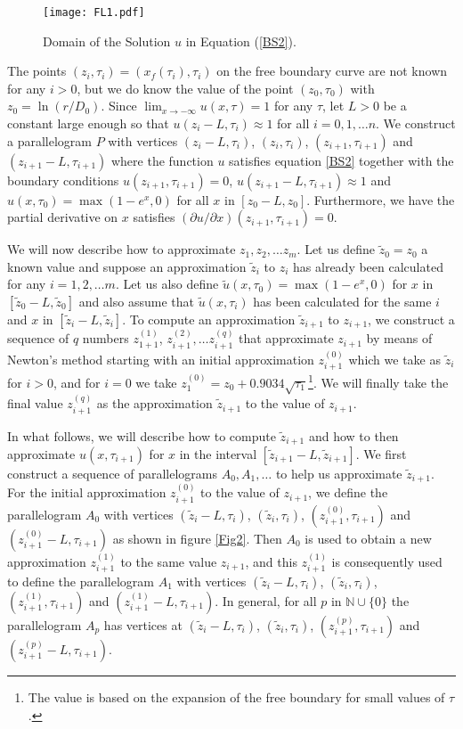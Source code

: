 \documentclass[00main.tex]{subfiles}
\begin{document}
\begin{figure}
\centering 
\texttt{[image: FL1.pdf]}
\caption{Domain of the Solution $u$ in Equation (\ref{BS2}).}
\label{Fig1}
\end{figure}  

The points $(z_i,\tau_i)=(x_f(\tau_i),\tau_i)$ on the free boundary curve are not known for any $i>0$, but we do know the value of the point $(z_0,\tau_0)$ with $z_0=\ln(r/D_0)$.  Since $\lim_{x\rightarrow -\infty} u(x,\tau)=1$ for any $\tau$, let $L>0$  be a constant large enough so that  $u(z_i-L,\tau_i)\approx 1$ for all $ i=0,1,\hdots n$.
We construct a parallelogram $P$ with vertices  $(z_i-L,\tau_i)$, $(z_i,\tau_i)$, $(z_{i+1},\tau_{i+1})$ and $(z_{i+1} - L,\tau_{i+1})$ where the function $u$ satisfies equation \eqref{BS2} together with the boundary conditions $u(z_{i+1},\tau_{i+1})=0$, $u(z_{i+1}-L,\tau_{i+1})\approx 1$ and $u(x,\tau_0)=\max(1-e^x,0)$ for all $x$ in $[z_0-L,z_0]$. Furthermore, we have the partial derivative on $x$ satisfies $ (\partial u / \partial x) (z_{i+1},\tau_{i+1})=0$.  

We will now describe how to approximate $z_1, z_2,\hdots z_m$.  Let us define $\tilde{z}_0=z_0$ a known value and suppose an approximation  $\tilde{z}_{i}$ to $z_{i}$ has already been calculated for any $i=1,2,\hdots m$. Let us also define $\tilde{u}(x,\tau_0)=\max(1-e^x,0)$ for $x$ in $[\tilde{z}_0-L,\tilde{z}_0]$ and also assume that $\tilde{u}(x,\tau_i)$ has been calculated for the same $i$ and $x$ in $ [\tilde{z}_i-L,\tilde{z}_i]$. To compute an approximation $\tilde{z}_{i+1}$ to $z_{i+1}$,  we construct a sequence of $q$ numbers $z_{1+1}^{(1)}$, $z_{i+1}^{(2)},\hdots z_{i+1}^{(q)}$ that approximate $z_{i+1}$ by means of Newton's method starting with an initial approximation $z_{i+1}^{(0)}$ which we take as $\tilde{z}_{i}$ for $i>0$, and for $i=0$ we take $z_{1}^{(0)}=z_0+0.9034\sqrt{\tau_1}$\footnote{The value is based on the expansion of the free boundary for small values of $\tau$.}.  We will finally take the final value $z_{i+1}^{(q)}$ as the approximation $\tilde{z}_{i+1}$ to the value of $z_{i+1}$. 


In what follows, we will describe how to compute $\tilde{z}_{i+1}$  and how to then approximate $u(x,\tau_{i+1})$ for $x$ in the interval $[\tilde{z}_{i+1}-L,\tilde{z}_{i+1}]$.  We first construct a sequence of  parallelograms $A_0, A_1,\hdots$ to help us approximate $\tilde{z}_{i+1}$.  For the initial approximation $z_{i+1}^{(0)}$ to the value of $z_{i+1}$,  we define the parallelogram $A_0$ with vertices $(\tilde{z}_i-L,\tau_i)$, $(\tilde{z}_i,\tau_i)$, $(z_{i+1}^{(0)},\tau_{i+1})$ and $(z_{i+1}^{(0)} - L,\tau_{i+1})$ as shown in figure \ref{Fig2}. Then $A_0$ is used to obtain a new approximation $z_{i+1}^{(1)}$ to the same value $z_{i+1}$, and this $z_{i+1}^{(1)}$ is consequently used to define the parallelogram $A_1$ with vertices  $(\tilde{z}_i-L,\tau_i)$, $(\tilde{z}_i,\tau_i)$, $(z_{i+1}^{(1)},\tau_{i+1})$ and $(z_{i+1}^{(1)} - L,\tau_{i+1})$.  In general, for all $p$ in $\mathbb{N} \cup \lbrace 0 \rbrace$ the parallelogram $A_p$ has vertices at $(\tilde{z}_i-L,\tau_i)$, $(\tilde{z}_i,\tau_i)$, $(z_{i+1}^{(p)},\tau_{i+1})$ and $(z_{i+1}^{(p)} - L,\tau_{i+1})$.
\end{document}
